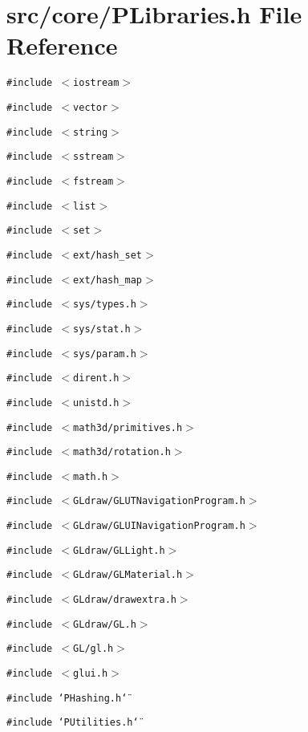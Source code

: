 \section{src/core/PLibraries.h File Reference}
\label{PLibraries_8h}


{\tt \#include $<$iostream$>$}\par
{\tt \#include $<$vector$>$}\par
{\tt \#include $<$string$>$}\par
{\tt \#include $<$sstream$>$}\par
{\tt \#include $<$fstream$>$}\par
{\tt \#include $<$list$>$}\par
{\tt \#include $<$set$>$}\par
{\tt \#include $<$ext/hash\_\-set$>$}\par
{\tt \#include $<$ext/hash\_\-map$>$}\par
{\tt \#include $<$sys/types.h$>$}\par
{\tt \#include $<$sys/stat.h$>$}\par
{\tt \#include $<$sys/param.h$>$}\par
{\tt \#include $<$dirent.h$>$}\par
{\tt \#include $<$unistd.h$>$}\par
{\tt \#include $<$math3d/primitives.h$>$}\par
{\tt \#include $<$math3d/rotation.h$>$}\par
{\tt \#include $<$math.h$>$}\par
{\tt \#include $<$GLdraw/GLUTNavigation\-Program.h$>$}\par
{\tt \#include $<$GLdraw/GLUINavigation\-Program.h$>$}\par
{\tt \#include $<$GLdraw/GLLight.h$>$}\par
{\tt \#include $<$GLdraw/GLMaterial.h$>$}\par
{\tt \#include $<$GLdraw/drawextra.h$>$}\par
{\tt \#include $<$GLdraw/GL.h$>$}\par
{\tt \#include $<$GL/gl.h$>$}\par
{\tt \#include $<$glui.h$>$}\par
{\tt \#include \char`\"{}PHashing.h\char`\"{}}\par
{\tt \#include \char`\"{}PUtilities.h\char`\"{}}\par
